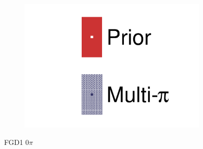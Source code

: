 \begin{figure}[h]
\begin{subfigure}[t]{0.32\textwidth}
		\includegraphics[width=\textwidth,page=27, trim={0mm 0mm 0mm 0mm}, clip]{figures/mach3/2018/data/2018a_FixedCov_RedCov_Mpi_Data_merge_drawPar_withDet}
	\end{subfigure}
	\caption{FGD1 0$\pi$}
	\label{fig:data_multipi_det_fdg1_cc0pi}
\end{figure}

